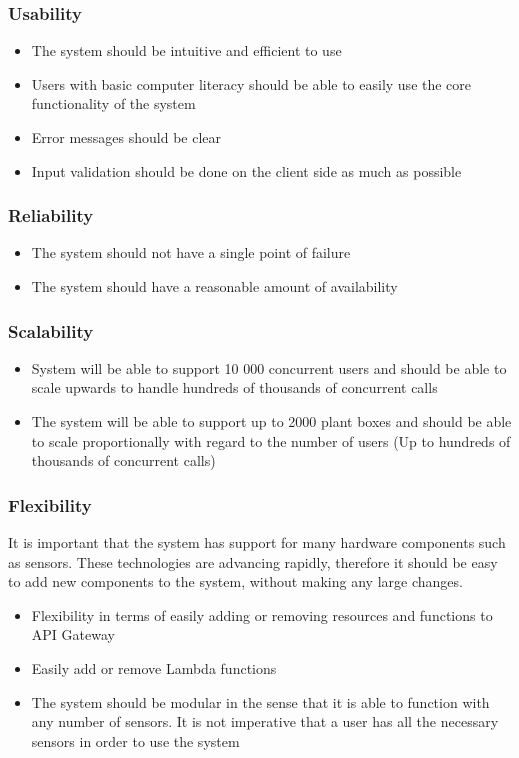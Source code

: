 \documentclass{article}
\begin{document}
		\subsubsection{Usability}
			\begin{itemize}
				\item The system should be intuitive and efficient to use
				\item Users with basic computer literacy should be able to easily use the core functionality of the system
				\item Error messages should be clear
				\item Input validation should be done on the client side as much as possible
			\end{itemize}
		\subsubsection{Reliability}
			\begin{itemize}
				\item The system should not have a single point of failure
				\item The system should have a reasonable amount of availability
			\end{itemize}
		\subsubsection{Scalability}
			\begin{itemize}
				\item System will be able to support 10 000 concurrent users and should be able to scale upwards to handle hundreds of thousands of concurrent calls
				\item The system will be able to support up to 2000 plant boxes and should be able to scale proportionally with regard to the number of users (Up to hundreds of thousands of concurrent calls)
			\end{itemize}
		\subsubsection{Flexibility}
			It is important that the system has support for many hardware components such as sensors. These technologies are advancing rapidly, therefore it should be easy to add new components to the system, without making any large changes.
			\begin{itemize}
				\item Flexibility in terms of easily adding or removing resources and functions to API Gateway
				\item Easily add or remove Lambda functions
				\item The system should be modular in the sense that it is able to function with any number of sensors. It is not imperative that a user has all the necessary sensors in order to use the system
			\end{itemize}
\end{document}
